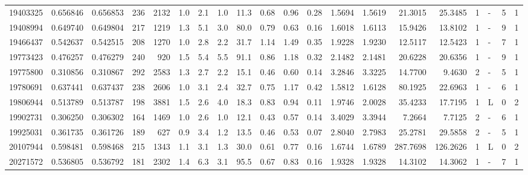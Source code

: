 \begin{tabular}{rrrrrrrrrrrrrrrrrlrl}
  19403325 & 0.656846 & 0.656853 &  236 & 2132 &      1.0 &      2.1 &     1.0 &    11.3 &   0.68 &   0.96 &       0.28 &  1.5694 &  1.5619 &   21.3015 &   25.3485 &       1 &             - &        5 &         1 \\
  19408994 & 0.649740 & 0.649804 &  217 & 1219 &      1.3 &      5.1 &     3.0 &    80.0 &   0.79 &   0.63 &       0.16 &  1.6018 &  1.6113 &   15.9426 &   13.8102 &       1 &             - &        9 &         1 \\
  19466437 & 0.542637 & 0.542515 &  208 & 1270 &      1.0 &      2.8 &     2.2 &    31.7 &   1.14 &   1.49 &       0.35 &  1.9228 &  1.9230 &   12.5117 &   12.5423 &       1 &             - &        7 &         1 \\
  19773423 & 0.476257 & 0.476279 &  240 &  920 &      1.5 &      5.4 &     5.5 &    91.1 &   0.86 &   1.18 &       0.32 &  2.1482 &  2.1481 &   20.6228 &   20.6356 &       1 &             - &        9 &         1 \\
  19775800 & 0.310856 & 0.310867 &  292 & 2583 &      1.3 &      2.7 &     2.2 &    15.1 &   0.46 &   0.60 &       0.14 &  3.2846 &  3.3225 &   14.7700 &    9.4630 &       2 &             - &        5 &         1 \\
  19780691 & 0.637441 & 0.637437 &  238 & 2606 &      1.0 &      3.1 &     2.4 &    32.7 &   0.75 &   1.17 &       0.42 &  1.5812 &  1.6128 &   80.1925 &   22.6963 &       1 &             - &        6 &         1 \\
  19806944 & 0.513789 & 0.513787 &  198 & 3881 &      1.5 &      2.6 &     4.0 &    18.3 &   0.83 &   0.94 &       0.11 &  1.9746 &  2.0028 &   35.4233 &   17.7195 &       1 &             L &        0 &         2 \\
  19902731 & 0.306250 & 0.306302 &  164 & 1469 &      1.0 &      2.6 &     1.0 &    12.1 &   0.43 &   0.57 &       0.14 &  3.4029 &  3.3944 &    7.2664 &    7.7125 &       2 &             - &        6 &         1 \\
  19925031 & 0.361735 & 0.361726 &  189 &  627 &      0.9 &      3.4 &     1.2 &    13.5 &   0.46 &   0.53 &       0.07 &  2.8040 &  2.7983 &   25.2781 &   29.5858 &       2 &             - &        5 &         1 \\
  20107944 & 0.598481 & 0.598468 &  215 & 1343 &      1.1 &      3.1 &     1.3 &    30.0 &   0.61 &   0.77 &       0.16 &  1.6744 &  1.6789 &  287.7698 &  126.2626 &       1 &             L &        0 &         2 \\
  20271572 & 0.536805 & 0.536792 &  181 & 2302 &      1.4 &      6.3 &     3.1 &    95.5 &   0.67 &   0.83 &       0.16 &  1.9328 &  1.9328 &   14.3102 &   14.3062 &       1 &             - &        7 &         1 \\

\end{tabular}
